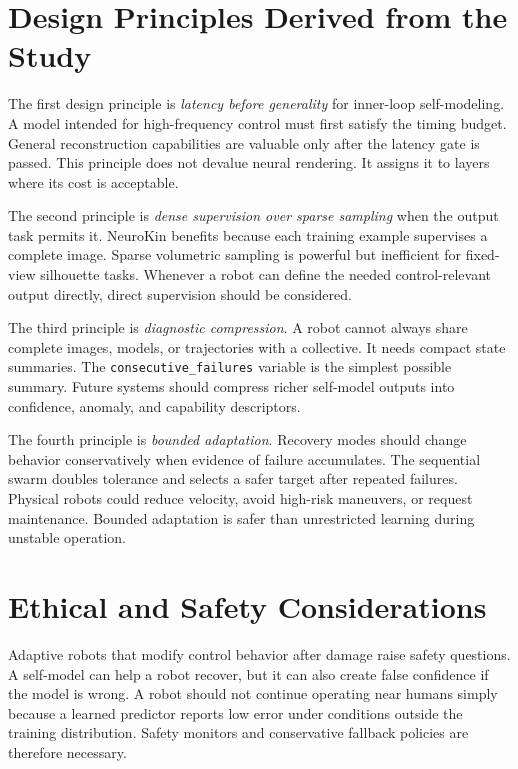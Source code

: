 \documentclass[12pt,a4paper,oneside]{report}
\begin{document}
\section{Design Principles Derived from the Study}

The first design principle is \emph{latency before generality} for inner-loop self-modeling. A model intended for high-frequency control must first satisfy the timing budget. General reconstruction capabilities are valuable only after the latency gate is passed. This principle does not devalue neural rendering. It assigns it to layers where its cost is acceptable.

The second principle is \emph{dense supervision over sparse sampling} when the output task permits it. NeuroKin benefits because each training example supervises a complete image. Sparse volumetric sampling is powerful but inefficient for fixed-view silhouette tasks. Whenever a robot can define the needed control-relevant output directly, direct supervision should be considered.

The third principle is \emph{diagnostic compression}. A robot cannot always share complete images, models, or trajectories with a collective. It needs compact state summaries. The \texttt{consecutive\_failures} variable is the simplest possible summary. Future systems should compress richer self-model outputs into confidence, anomaly, and capability descriptors.

The fourth principle is \emph{bounded adaptation}. Recovery modes should change behavior conservatively when evidence of failure accumulates. The sequential swarm doubles tolerance and selects a safer target after repeated failures. Physical robots could reduce velocity, avoid high-risk maneuvers, or request maintenance. Bounded adaptation is safer than unrestricted learning during unstable operation.

\section{Ethical and Safety Considerations}

Adaptive robots that modify control behavior after damage raise safety questions. A self-model can help a robot recover, but it can also create false confidence if the model is wrong. A robot should not continue operating near humans simply because a learned predictor reports low error under conditions outside the training distribution. Safety monitors and conservative fallback policies are therefore necessary.
\end{document}
